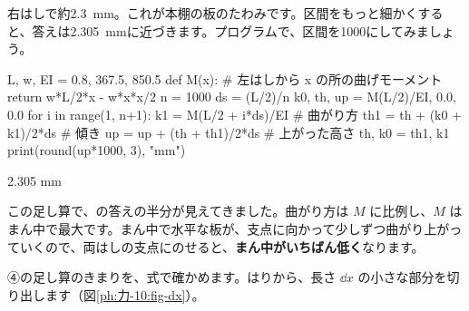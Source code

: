 \begin{bkcenter}
\end{bkcenter}
右はしで約\qty{2.3}{mm}。これが本棚の板のたわみです。区間をもっと細かくすると、答えは\qty{2.305}{mm}に近づきます。プログラムで、区間を1000にしてみましょう。

\begin{phcode}
L, w, EI = 0.8, 367.5, 850.5
def M(x):                     \# 左はしから x の所の曲げモーメント
    return w*L/2*x - w*x*x/2
n = 1000
ds = (L/2)/n
k0, th, up = M(L/2)/EI, 0.0, 0.0
for i in range(1, n+1):
    k1 = M(L/2 + i*ds)/EI     \# 曲がり方
    th1 = th + (k0 + k1)/2*ds   \# 傾き
    up = up + (th + th1)/2*ds   \# 上がった高さ
    th, k0 = th1, k1
print(round(up*1000, 3), "mm")
\end{phcode}
\begin{phcodeout}
2.305 mm
\end{phcodeout}

\noindent この足し算で、\bkhatenaref の答えの半分が見えてきました。曲がり方は $M$ に比例し、$M$ はまん中で最大です。まん中で水平な板が、支点に向かって少しずつ曲がり上がっていくので、両はしの支点にのせると、\textbf{まん中がいちばん低く}なります。

\phkokomade


\label{ph:力-10:sec6}④の足し算のきまりを、式で確かめます。はりから、長さ $\dd x$ の小さな部分を切り出します（図\ref{ph:力-10:fig-dx}）。

